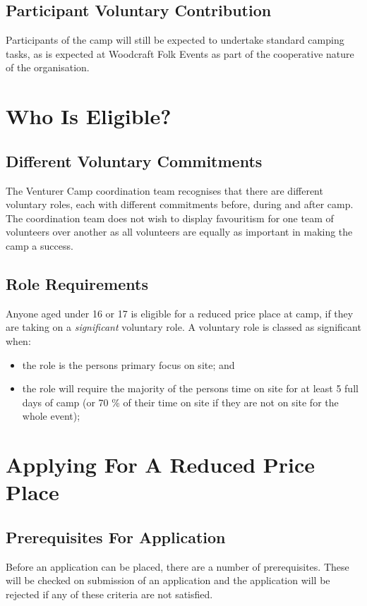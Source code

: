 \documentclass[a4paper, 11pt]{article}
\begin{document}
\subsection{Participant Voluntary Contribution}
Participants of the camp will still be expected to undertake standard camping tasks, as is expected at Woodcraft Folk Events as part of the cooperative nature of the organisation. 

\section{Who Is Eligible?}
\subsection{Different Voluntary Commitments}
The Venturer Camp coordination team recognises that there are different voluntary roles, each with different commitments before, during and after camp. The coordination team does not wish to display favouritism for one team of volunteers over another as all volunteers are equally as important in making the camp a success.

\subsection{Role Requirements}
Anyone aged under 16 or 17 is eligible for a reduced price place at camp, if they are taking on a \textit{significant} voluntary role. A voluntary role is classed as significant when:
\begin{itemize}
    \item the role is the persons primary focus on site; and
    \item the role will require the majority of the persons time on site for at least 5 full days of camp (or 70 \% of their time on site if they are not on site for the whole event);
\end{itemize}

\section{Applying For A Reduced Price Place}
\subsection{Prerequisites For Application}
Before an application can be placed, there are a number of prerequisites. These will be checked on submission of an application and the application will be rejected if any of these criteria are not satisfied.\\
\end{document}
